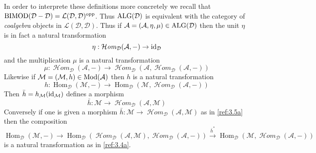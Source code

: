 \documentclass{amsproc}
\def\Ascr{{\mathcal A}}
\def\Dscr{{\mathcal D}}
\def\Hscr{{\mathcal H}}
\def\Lscr{{\mathcal L}}
\def\Mscr{{\mathcal M}}
\def\HHom{\operatorname {\Hscr \mathit{om}}}
\def\Id{\text{id}}
\def\Mod{\mathop{\text{Mod}}}
\def\BIMOD{\mathop{\text{BIMOD}}}
\def\ALG{\mathop{\text{ALG}}}
\def\Hom{\operatorname {Hom}}
\def\HHom{\operatorname {\Hscr \mathit{om}}}
\def\r{\rightarrow}
\let\oldtext\text
\def\text#1{\oldtext{\upshape #1}}
\theoremstyle{definition}
\theoremstyle{remark}
\numberwithin{equation}{section}
\numberwithin{table}{section}
\numberwithin{figure}{section}
\begin{document}
In order to interprete these definitions more concretely we 
recall that
$\BIMOD(\Dscr-\Dscr)=\Lscr(\Dscr,\Dscr)^{\text{opp}}$. Thus
$\ALG(\Dscr)$ is equivalent with the category of \emph{coalgebra}
objects in $\Lscr(\Dscr,\Dscr)$. Thus if
$\Ascr=(\Ascr,\eta,\mu)\in\ALG(\Dscr)$ then the unit $\eta$ is in fact
a natural transformation
\[
\eta:\HHom_\Dscr(\Ascr,-)\r \Id_\Dscr
\]
and the multiplication $\mu$ is a natural transformation
\begin{equation}
\label{ref:3.3a}
\mu:\HHom_\Dscr(\Ascr,-)\r \HHom_\Dscr(\Ascr,\HHom_\Dscr(\Ascr,-))
\end{equation}
Likewise if $\Mscr=(\Mscr,h)\in\Mod(\Ascr)$ then $h$ is a natural
transformation 
\begin{equation}
\label{ref:3.4a}
h: \Hom_\Dscr(\Mscr,-)\r \Hom_\Dscr(\Mscr,\HHom_\Dscr(\Ascr,-))
\end{equation}
Then  $\bar{h}=h_\Mscr(\Id_\Mscr)$ defines a morphism
\begin{equation}
\label{ref:3.5a}
\bar{h}:\Mscr\r \HHom_\Dscr(\Ascr,\Mscr)
\end{equation}
Conversely if one is given a morphism $\bar{h}:\Mscr\r
\HHom_\Dscr(\Ascr,\Mscr)$ as in \eqref{ref:3.5a} then the composition
\[
\Hom_\Dscr(\Mscr,-)\r \Hom_\Dscr(\HHom_\Dscr(\Ascr,\Mscr),
\HHom_\Dscr(\Ascr,-)) \xrightarrow{\bar{h}^\ast}
\Hom_\Dscr(\Mscr,\HHom_\Dscr(\Ascr,-)) 
\]
is a natural transformation as in \eqref{ref:3.4a}. 
\end{document}
